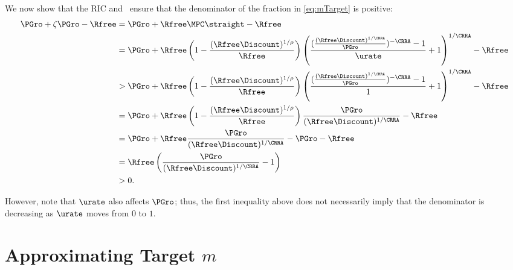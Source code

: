 \documentclass{handout}
\begin{document}
We now show that the RIC and \GICPGro~ensure that the denominator of the fraction in \eqref{eq:mTarget} is positive: 
\begin{equation*}\begin{gathered}\begin{aligned}
\PGro + \zeta \PGro - \Rfree & =  \PGro + \Rfree \MPCU \straight - \Rfree
 \\& =  \PGro + \Rfree \left(1- \frac{(\Rfree \Discount)^{1/\rho}}{\Rfree}\right) \left(\frac{(\frac{(\Rfree\Discount)^{1/\CRRA}}{\PGro})^{-\CRRA}-1}{\urate}+1\right)^{1/\CRRA}-\Rfree
 \\& >   \PGro+\Rfree \left(1-\frac{(\Rfree\Discount)^{1/\rho}}{\Rfree}\right)
\left(\frac{(\frac{(\Rfree\Discount)^{1/\CRRA}}{\PGro})^{-\CRRA}-1}{1}+1\right)^{1/\CRRA}-\Rfree
 \\& =  \PGro+\Rfree\left(1-\frac{(\Rfree\Discount)^{1/\rho}}{\Rfree}\right)\frac{\PGro}{(\Rfree\Discount)^{1/\CRRA}}-\Rfree
 \\& =  \PGro+\Rfree \frac{\PGro}{(\Rfree\Discount)^{1/\CRRA}}- \PGro - \Rfree
 \\& =  \Rfree \left(\frac{\PGro}{(\Rfree\Discount)^{1/\CRRA}}-1\right)
 \\& >  0.
\end{aligned}\end{gathered}\end{equation*}

However, note that $\urate$ also affects $\PGro$; thus, the first inequality above does
not necessarily imply that the denominator is decreasing as $\urate$ moves from $0$ to $1$.


\section{Approximating Target $m$}
\end{document}
